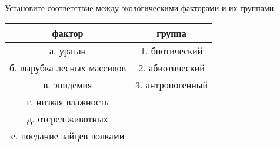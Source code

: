 Установите соответствие между экологическими факторами и их группами. \\
\begin{tabular}{|c|c|}
    \hline
    фактор & группа \\
    \hline
    а. ураган & 1. биотический \\
    б. вырубка лесных массивов & 2. абиотический \\
    в. эпидемия & 3. антропогенный \\
    г. низкая влажность & \\
    д. отсрел животных & \\
    е. поедание зайцев волками & \\
    \hline
\end{tabular}

